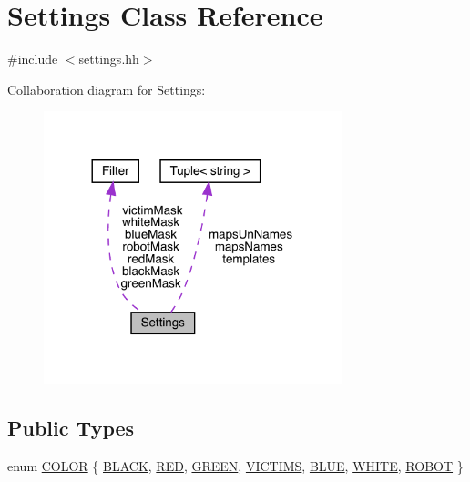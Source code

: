\hypertarget{class_settings}{}\section{Settings Class Reference}
\label{class_settings}


{\ttfamily \#include $<$settings.\+hh$>$}



Collaboration diagram for Settings\+:
\nopagebreak
\begin{figure}[H]
\begin{center}
\leavevmode
\includegraphics[width=245pt]{class_settings__coll__graph}
\end{center}
\end{figure}
\subsection*{Public Types}
\begin{DoxyCompactItemize}
\item 
enum \mbox{\hyperlink{class_settings_a30d85f2e06a54ae9bc8da2d01037658f}{C\+O\+L\+OR}} \{ \newline
\mbox{\hyperlink{class_settings_a30d85f2e06a54ae9bc8da2d01037658fad72cf235641afa26b82dc5bb8b0db4e1}{B\+L\+A\+CK}}, 
\mbox{\hyperlink{class_settings_a30d85f2e06a54ae9bc8da2d01037658fa164128164b54423f54968a67580a4ce3}{R\+ED}}, 
\mbox{\hyperlink{class_settings_a30d85f2e06a54ae9bc8da2d01037658fa79963b69fcbb589ae6f3f09ac6c5ae90}{G\+R\+E\+EN}}, 
\mbox{\hyperlink{class_settings_a30d85f2e06a54ae9bc8da2d01037658fab4951d8c5bc23e9dab4e9cb53ef3fb26}{V\+I\+C\+T\+I\+MS}}, 
\newline
\mbox{\hyperlink{class_settings_a30d85f2e06a54ae9bc8da2d01037658fa23f16922180d0f5fdc679584f75f83c3}{B\+L\+UE}}, 
\mbox{\hyperlink{class_settings_a30d85f2e06a54ae9bc8da2d01037658fa4cb51c6b271152a84e37b4415ad08168}{W\+H\+I\+TE}}, 
\mbox{\hyperlink{class_settings_a30d85f2e06a54ae9bc8da2d01037658fa1cf089d6c6dda465fa704222461f0b28}{R\+O\+B\+OT}}
 \}
\end{DoxyCompactItemize}
